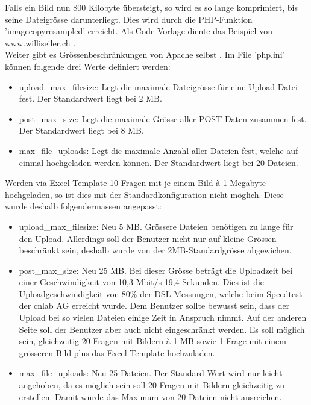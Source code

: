 Falls ein Bild nun 800 Kilobyte übersteigt, so wird es so lange komprimiert, bis seine Dateigrösse darunterliegt. Dies wird durch die PHP-Funktion 'imagecopyresampled' erreicht. Als Code-Vorlage diente das Beispiel von www.williseiler.ch \cite{willis_php}. \\

Weiter gibt es Grössenbeschränkungen von Apache selbst \cite{stackoverflow_largeFilePHP}. Im File 'php.ini' können folgende drei Werte definiert werden:
\begin{itemize}
	\item upload\_max\_filesize: Legt die maximale Dateigrösse für eine Upload-Datei fest. Der Standardwert liegt bei 2 MB.
	\item post\_max\_size: Legt die maximale Grösse aller POST-Daten zusammen fest. Der Standardwert liegt bei 8 MB.
	\item max\_file\_uploads: Legt die maximale Anzahl aller Dateien fest, welche auf einmal hochgeladen werden können. Der Standardwert liegt bei 20 Dateien.
\end{itemize}

Werden via Excel-Template 10 Fragen mit je einem Bild à 1 Megabyte hochgeladen, so ist dies mit der Standardkonfiguration nicht möglich. Diese wurde deshalb folgendermassen angepasst:
\begin{itemize}
	\label{php.ini:neueGroessenbeschraenkungen}
	\item upload\_max\_filesize: Neu 5 MB. Grössere Dateien benötigen zu lange für den Upload. Allerdings soll der Benutzer nicht nur auf kleine Grössen beschränkt sein, deshalb wurde von der 2MB-Standardgrösse abgewichen.
	\item post\_max\_size: Neu 25 MB. Bei dieser Grösse beträgt die Uploadzeit bei einer Geschwindigkeit von 10,3 Mbit/s 19,4 Sekunden. Dies ist die Uploadgeschwindigkeit von 80\% der DSL-Messungen, welche beim Speedtest der cnlab AG \cite{cnlab_speedtest} erreicht wurde. Dem Benutzer sollte bewusst sein, dass der Upload bei so vielen Dateien einige Zeit in Anspruch nimmt.
	Auf der anderen Seite soll der Benutzer aber auch nicht eingeschränkt werden. Es soll möglich sein, gleichzeitig 20 Fragen mit Bildern à 1 MB sowie 1 Frage mit einem grösseren Bild plus das Excel-Template hochzuladen.
	\item max\_file\_uploads: Neu 25 Dateien. Der Standard-Wert wird nur leicht angehoben, da es möglich sein soll 20 Fragen mit Bildern gleichzeitig zu erstellen. Damit würde das Maximum von 20 Dateien nicht ausreichen.
\end{itemize}

